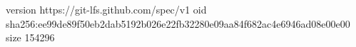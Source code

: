 version https://git-lfs.github.com/spec/v1
oid sha256:ee99de89f50eb2dab5192b026e22fb32280e09aa84f682ac4e6946ad08e00e00
size 154296
